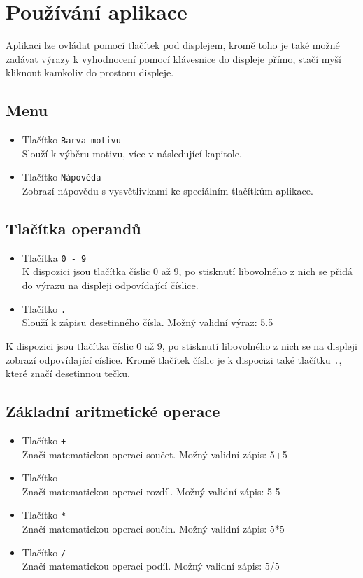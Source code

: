 \documentclass[a4paper, 11pt]{article}
\begin{document}
\newpage
\section{Používání aplikace}
Aplikaci lze ovládat pomocí tlačítek pod displejem, kromě toho je také možné zadávat výrazy k vyhodnocení pomocí klávesnice do displeje přímo, stačí myší kliknout kamkoliv do prostoru displeje.
\subsection{Menu}
\begin{itemize}
\item Tlačítko \texttt{Barva motivu}\\Slouží k výběru motivu, více v následující kapitole.
\item Tlačítko \texttt{Nápověda}\\Zobrazí nápovědu s vysvětlivkami ke speciálním tlačítkům aplikace.
\end{itemize}
\subsection{Tlačítka operandů}
\begin{itemize}
\item Tlačítka \texttt{0 - 9}\\K dispozici jsou tlačítka číslic 0 až 9, po stisknutí libovolného z nich se přidá do výrazu na displeji odpovídající číslice.
\item Tlačítko \texttt{.}\\Slouží k zápisu desetinného čísla. Možný validní výraz: 5.5
\end{itemize}
K dispozici jsou tlačítka číslic 0 až 9, po stisknutí libovolného z nich se na displeji zobrazí odpovídající císlice. Kromě tlačítek číslic je k dispocizi také tlačítku \texttt{.}, které značí desetinnou tečku.
\subsection{Základní aritmetické operace}
\begin{itemize}
\item Tlačítko \texttt{+}\\Značí matematickou operaci součet. Možný validní zápis: 5+5
\item Tlačítko \texttt{-}\\Značí matematickou operaci rozdíl. Možný validní zápis: 5-5
\item Tlačítko \texttt{*}\\Značí matematickou operaci součin. Možný validní zápis: 5*5
\item Tlačítko \texttt{/}\\Značí matematickou operaci podíl. Možný validní zápis: 5/5
\end{itemize}
\end{document}
